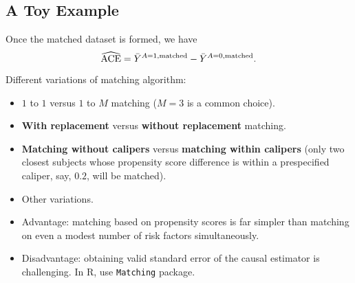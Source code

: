 \subsection*{A Toy Example}
\begin{Example}{}
      \begin{center}
      \end{center}
      Once the matched dataset is formed, we have
      \[ \widehat{\text{ACE}}=\bar{Y}^{A=1,\text{matched}}-\bar{Y}^{A=0,\text{matched}}. \]
\end{Example}
Different variations of matching algorithm:
\begin{itemize}
      \item $1$ to $1$ versus $1$ to $M$ matching ($M=3$ is a common choice).
      \item \textbf{With replacement} versus \textbf{without replacement} matching.
      \item \textbf{Matching without calipers} versus \textbf{matching within calipers}
            (only two closest subjects whose propensity score difference is
            within a prespecified caliper, say, $0.2$, will be matched).
      \item Other variations.
      \item Advantage: matching based on propensity scores is far simpler
            than matching on even a modest number of risk factors
            simultaneously.
      \item Disadvantage: obtaining valid standard error of the causal
            estimator is challenging. In R, use \texttt{Matching} package.
\end{itemize}
